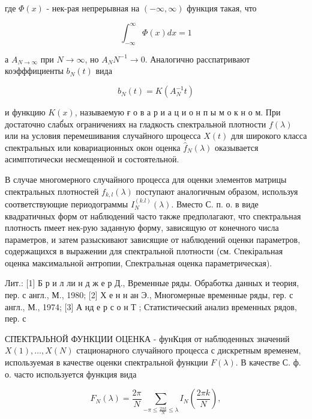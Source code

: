 \documentclass[10pt]{article}
\begin{document}
где $\Phi(x)$ - нек-рая непрерывная на $(-\infty, \infty)$ функция такая, что



\[

\int_{-\infty}^{\infty} \Phi(x) d x=1

\]



а $A_{N \rightarrow \infty}$ при $N \rightarrow \infty$, но $A_{N} N^{-1} \rightarrow 0$. Аналогично расспатривают коэфффициенты $b_{N}(t)$ вида



\[

b_{N}(t)=K\left(A_{N}^{-1} t\right)

\]



и функцию $K(x)$, называемую ғ о в а р и а ц и о н п ы м о к н о м. При достаточно слаб́ых ограничениях на гладкость спектральной плотности $f(\lambda)$ или на условия перемешивания случайного шроцесса $X(t)$ для широкого класса спектральных или ковариационных окон оценка $\hat{f}_{N}(\lambda)$ оказывается асимптотически несмещенной и состоятельноӥ.



В случае многомерного случайного процесса для оценки элементов матрицы спектральных плотностей $f_{k, l}(\lambda)$ поступают аналогичным образом, используя соответствующие периодограммы $I_{N}^{(k . l)}(\lambda)$. Вместо С. п. о. в виде квадратичных форм от наблюдений часто также предполагают, что спектральная плотность пмеет нек-рую заданную форму, зависящую от конечного числа параметров, и затем разыскивают зависящие от наблюдений оценки параметров, содержащихся в выражении для спектральной плотности (см. Cпекіральная оценка максимальной әнтропии, Спектральная оценка параметрическая).



Лит.: [1] Б р и л ли н д ж е р Д., Временные ряды. Обработка данных и теория, пер. с англ., М., 1980; [2] Х е н н ан Э., Многомерные временные ряды, гер. с англ., М., 1974; [3] А нд е р с о н Т ; Статистический анализ временных рядов, пер. с



СП̈ЕКТРАЈЬНОЙ ФУНКЦИИ ОЦЕНКА - фунКция от наблюденных значений $X(1), \ldots, X(N)$ стационарного случайного процесса с дискретным временем, используемая в качестве оценки спектральной функции $F(\lambda)$. В качестве С. ф. о. часто используется функция вида



\[

F_{N}(\lambda)=\frac{2 \pi}{N} \sum_{-\pi \leqslant \frac{2 \pi k}{N} \leqslant \lambda} I_{N}\left(\frac{2 \pi k}{N}\right),

\]
\end{document}
